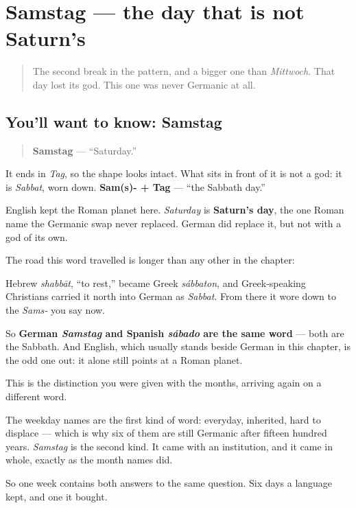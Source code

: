 \section[Samstag]{Samstag — the day that is not Saturn's}

\label{lesson:GE-C07-samstag}



\begin{quote}
The second break in the pattern, and a bigger one than \emph{Mittwoch}. That day lost its god. This one was never Germanic at all.
\end{quote}

\subsection*{You'll want to know: Samstag}
\begin{quote}
\textbf{Samstag} — \textquotedblleft{}Saturday.\textquotedblright{}
\end{quote}

It ends in \emph{Tag}, so the shape looks intact. What sits in front of it is not a god: it is \emph{Sabbat}, worn down. \textbf{Sam(s)- + Tag} — \textquotedblleft{}the Sabbath day.\textquotedblright{}

English kept the Roman planet here. \emph{Saturday} is \textbf{Saturn's day}, the one Roman name the Germanic swap never replaced. German did replace it, but not with a god of its own.

\begin{cousinweb}
The road this word travelled is longer than any other in the chapter:

Hebrew \emph{shabbāt}, \textquotedblleft{}to rest,\textquotedblright{} became Greek \emph{sábbaton}, and Greek-speaking Christians carried it north into German as \emph{Sabbat}. From there it wore down to the \emph{Sams-} you say now.

So \textbf{German \emph{Samstag} and Spanish \emph{sábado} are the same word} — both are the Sabbath. And English, which usually stands beside German in this chapter, is the odd one out: it alone still points at a Roman planet.
\end{cousinweb}

\begin{culture}
This is the distinction you were given with the months, arriving again on a different word.

The weekday names are the first kind of word: everyday, inherited, hard to displace — which is why six of them are still Germanic after fifteen hundred years. \emph{Samstag} is the second kind. It came with an institution, and it came in whole, exactly as the month names did.

So one week contains both answers to the same question. Six days a language kept, and one it bought.
\end{culture}

